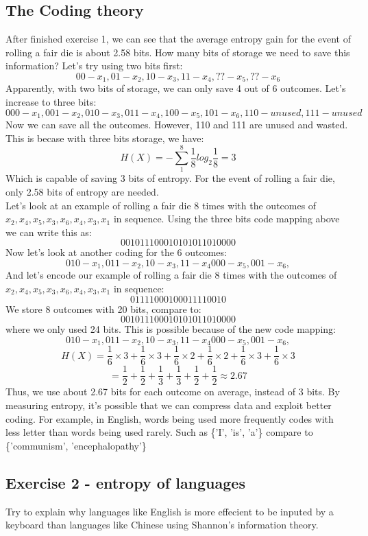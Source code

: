 \documentclass[12pt]{article}
\begin{document}
\subsection{The Coding theory}
After finished exercise 1, we can see that the average entropy gain for the event of rolling a fair die is about 2.58 bits. How many bits of storage we need to save this information? Let's try using two bits first:
\[
	00 - x_1,
	01 - x_2,
	10 - x_3,
	11 - x_4,
	?? - x_5,
	?? - x_6
\]
Apparently, with two bits of storage, we can only save 4 out of 6 outcomes. Let's increase to three bits:
\[
	000 - x_1,
	001 - x_2,
	010 - x_3,
	011 - x_4,
	100 - x_5,
	101 - x_6,
	110 - unused,
	111 - unused
\]
Now we can save all the outcomes. However, 110 and 111 are unused and wasted. This is becase with three bits storage, we have:
\[
	H(X) = - \sum_1^8 \frac{1}{8} log_2 \frac{1}{8} = 3
\]
Which is capable of saving 3 bits of entropy. For the event of rolling a fair die, only 2.58 bits of entropy are needed.\\
Let's look at an example of rolling a fair die 8 times with the outcomes of $x_2,x_4,x_5,x_3,x_6,x_4,x_3,x_1$ in sequence. Using the three bits code mapping above we can write this as:
\[
	001011100010101011010000
\]
Now let's look at another coding for the 6 outcomes:
\[
	010 - x_1,
	011 - x_2,
	10 - x_3,
	11 - x_4
	000 - x_5,
	001 - x_6,
\]
And let's encode our example of rolling a fair die 8 times with the outcomes of $x_2,x_4,x_5,x_3,x_6,x_4,x_3,x_1$ in sequence:
\[
	01111000100011110010
\]
We store 8 outcomes with 20 bits, compare to:
\[
	001011100010101011010000
\]
where we only used 24 bits. This is possible because of the new code mapping:
\[
	010 - x_1,
	011 - x_2,
	10 - x_3,
	11 - x_4
	000 - x_5,
	001 - x_6,
\]
\[
	H(X) = \frac{1}{6} \times 3 + \frac{1}{6} \times 3 + \frac{1}{6} \times 2 + \frac{1}{6} \times 2 + \frac{1}{6} \times 3 + \frac{1}{6} \times 3
\]
\[
	= \frac{1}{2} + \frac{1}{2}+ \frac{1}{3}+ \frac{1}{3}+ \frac{1}{2}+ \frac{1}{2} \approx 2.67
\]
Thus, we use about 2.67 bits for each outcome on average, instead of 3 bits. By measuring entropy, it's possible that we can compress data and exploit better coding. For example, in English, words being used more frequently codes with less letter than words being used rarely. Such as \{'I', 'is', 'a'\} compare to \{'communism', 'encephalopathy'\}

\subsection{Exercise 2 - entropy of languages}
Try to explain why languages like English is more effecient to be inputed by a keyboard than languages like Chinese using Shannon's information theory.\\
\end{document}
